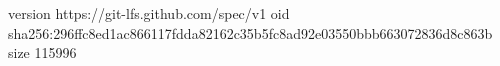 version https://git-lfs.github.com/spec/v1
oid sha256:296ffc8ed1ac866117fdda82162c35b5fc8ad92e03550bbb663072836d8c863b
size 115996
